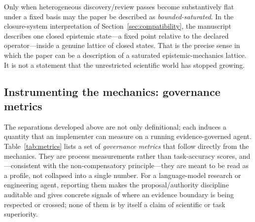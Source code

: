 Only when heterogeneous discovery/review passes become substantively flat under a fixed basis may the paper be described as \emph{bounded-saturated}. In the closure-system interpretation of Section~\ref{sec:compatibility}, the manuscript describes one closed epistemic state---a fixed point relative to the declared operator---inside a genuine lattice of closed states. That is the precise sense in which the paper can be a description of a saturated epistemic-mechanics lattice. It is not a statement that the unrestricted scientific world has stopped growing.

\subsection{Instrumenting the mechanics: governance metrics}
\label{sec:metrics}

The separations developed above are not only definitional; each induces a quantity that an implementer can measure on a running evidence-governed agent. Table~\ref{tab:metrics} lists a set of \emph{governance metrics} that follow directly from the mechanics. They are process measurements rather than task-accuracy scores, and---consistent with the non-compensatory principle---they are meant to be read as a profile, not collapsed into a single number. For a language-model research or engineering agent, reporting them makes the proposal/authority discipline auditable and gives concrete signals of where an evidence boundary is being respected or crossed; none of them is by itself a claim of scientific or task superiority.


